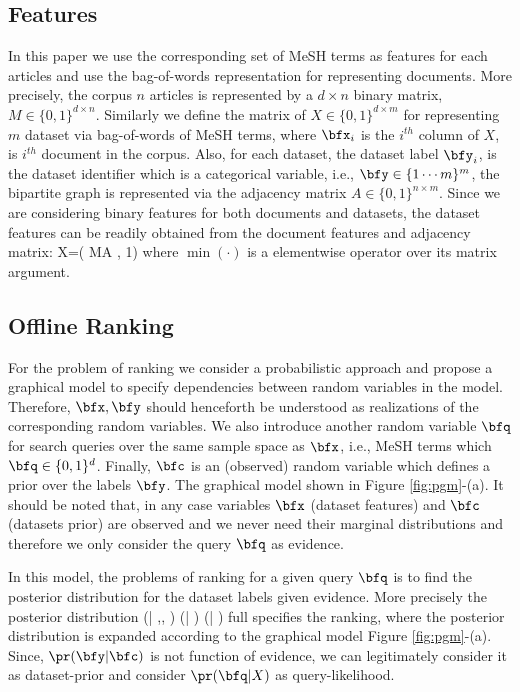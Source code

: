 \documentclass[twoside,11pt]{article}
\begin{document}
\subsection{Features}
In this paper we use the corresponding set of MeSH terms as features for each articles and use the bag-of-words representation for representing documents. More precisely, the corpus $n$ articles is represented by a $d \times n$ binary matrix, $M\in \{0,1\}^{d\times n}$. Similarly we define the matrix of $X\in \{0,1\}^{d\times m}$ for representing $m$ dataset via bag-of-words of MeSH terms, where $\bfx_i$ is the $i^{th}$ column of $X$, is $i^{th}$ document in the corpus. Also, for each dataset, the dataset  label $\bfy_i$, is the dataset identifier which is a categorical variable, i.e., $\bfy \in \{{1\cdots m}\}^m$, the bipartite graph is represented via the adjacency matrix $A\in \{0,1\}^{n\times m}$. Since we are considering binary features for both documents and datasets, the dataset features can be readily obtained from the document features and adjacency matrix:
\beq
X=\min( MA , 1)
\eeq
where $\min(\cdot)$ is a elementwise operator over its matrix argument.

\subsection{Offline Ranking}
For the problem of ranking we consider a probabilistic approach and propose a graphical model to specify dependencies between random variables in the model. Therefore, $\bfx, \bfy$ should henceforth be understood as realizations of the corresponding random variables.
We also introduce another random variable $\bfq$ for search queries over the same sample space as $\bfx$, i.e., MeSH terms which $\bfq \in\{0,1\}^{d}$.  Finally, $\bfc$ is an (observed) random variable which defines a prior over the labels $\bfy$.
The graphical model shown in Figure \ref{fig:pgm}-(a). It should be noted that, in any case variables $\bfx$ (dataset features) and $\bfc$ (datasets prior) are observed and we never need their marginal distributions and therefore we only consider the query $\bfq$ as evidence.

In this model, the problems of ranking for a given query $\bfq$ is to find the posterior distribution for the dataset labels given evidence. More precisely the posterior distribution
\beq
\pr(\bfy | \bfq,\bfc, \bfx) \propto \pr(\bfy | \bfc ) \pr(\bfq | \bfx)
\eeq
full specifies the ranking, where the posterior distribution is expanded according to the graphical model Figure \ref{fig:pgm}-(a). 
Since, $\pr(\bfy | \bfc )$  is not function of evidence, we can legitimately consider it as dataset-prior and consider $\pr(\bfq | X)$ as query-likelihood.
\end{document}
